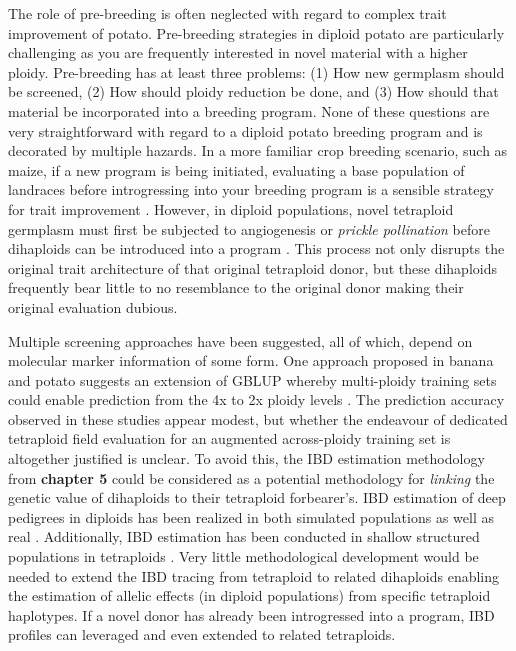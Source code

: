 \documentclass[
]{article}
\begin{document}
The role of pre-breeding is often neglected with regard to complex trait
improvement of potato. Pre-breeding strategies in diploid potato are
particularly challenging as you are frequently interested in novel
material with a higher ploidy. Pre-breeding has at least three problems:
(1) How new germplasm should be screened, (2) How should ploidy
reduction be done, and (3) How should that material be incorporated into
a breeding program. None of these questions are very straightforward
with regard to a diploid potato breeding program and is decorated by
multiple hazards. In a more familiar crop breeding scenario, such as
maize, if a new program is being initiated, evaluating a base population
of landraces before introgressing into your breeding program is a
sensible strategy for trait improvement \autocite{Gorjanc2016}. However,
in diploid populations, novel tetraploid germplasm must first be
subjected to angiogenesis or \emph{prickle pollination} before
dihaploids can be introduced into a program
\autocite{Uijtewaal1987,Tai2003}. This process not only disrupts the
original trait architecture of that original tetraploid donor, but these
dihaploids frequently bear little to no resemblance to the original
donor making their original evaluation dubious.

Multiple screening approaches have been suggested, all of which, depend
on molecular marker information of some form. One approach proposed in
banana and potato suggests an extension of GBLUP whereby multi-ploidy
training sets could enable prediction from the 4x to 2x ploidy levels
\autocite{Nyine2018,Wilson2021}. The prediction accuracy observed in
these studies appear modest, but whether the endeavour of dedicated
tetraploid field evaluation for an augmented across-ploidy training set
is altogether justified is unclear. To avoid this, the IBD estimation
methodology from \textbf{chapter 5} could be considered as a potential
methodology for \emph{linking} the genetic value of dihaploids to their
tetraploid forbearer's. IBD estimation of deep pedigrees in diploids has
been realized in both simulated populations as well as real
\autocite{Li2021}. Additionally, IBD estimation has been conducted in
shallow structured populations in tetraploids
\autocite{Amadeu2021,Song2023}. Very little methodological development
would be needed to extend the IBD tracing from tetraploid to related
dihaploids enabling the estimation of allelic effects (in diploid
populations) from specific tetraploid haplotypes. If a novel donor has
already been introgressed into a program, IBD profiles can leveraged and
even extended to related tetraploids.
\end{document}
